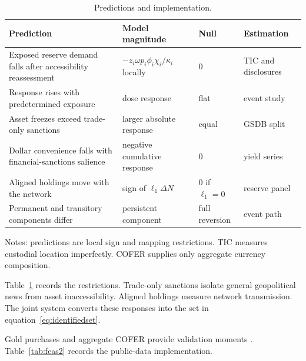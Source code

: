 \documentclass[11pt]{article}
\theoremstyle{definition}
\begin{document}
\begin{table}[t]
\centering
\caption{Predictions and implementation.}
\label{tab:evidence2}
\begin{tabular}{p{6.4cm}p{3.1cm}p{2.2cm}p{2.2cm}}
\toprule
Prediction & Model magnitude & Null & Estimation \\
\midrule
Exposed reserve demand falls after accessibility reassessment & $-z_i\omega p_i\phi_i\chi_i/\kappa_i$ locally & 0 & TIC and disclosures \\
Response rises with predetermined exposure & dose response & flat & event study \\
Asset freezes exceed trade-only sanctions & larger absolute response & equal & GSDB split \\
Dollar convenience falls with financial-sanctions salience & negative cumulative response & 0 & yield series \\
Aligned holdings move with the network & sign of $\ell_1\Delta N$ & 0 if $\ell_1=0$ & reserve panel \\
Permanent and transitory components differ & persistent component & full reversion & event path \\
\bottomrule
\end{tabular}
\par\smallskip
\begin{minipage}{0.95\textwidth}
\footnotesize Notes: predictions are local sign and mapping restrictions. TIC measures custodial location imperfectly. COFER supplies only aggregate currency composition.
\end{minipage}
\end{table}

Table~\ref{tab:evidence2} records the restrictions. Trade-only sanctions isolate general geopolitical news from asset inaccessibility. Aligned holdings measure network transmission. The joint system converts these responses into the set in equation~\eqref{eq:identifiedset}.

Gold purchases and aggregate COFER provide validation moments \citep{WGC2024,ArslanalpEichengreenSimpsonBell2022}. Table~\ref{tab:feas2} records the public-data implementation.
\end{document}
